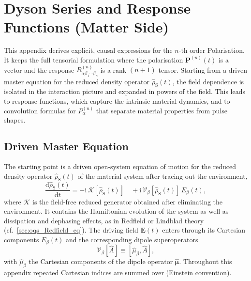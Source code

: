 \chapter{Dyson Series and Response Functions (Matter Side)}
\label{app:response_functions}

This appendix derives explicit, causal expressions for the $n$-th order Polarisation. It keeps the full tensorial formulation where the polarisation $\boldsymbol P^{(n)}(t)$ is a vector and the response $R^{(n)}_{\alpha\beta_1\cdots\beta_n}$ is a rank-$(n{+}1)$ tensor. Starting from a driven master equation for the reduced density operator $\hat{\rho}_{\mathrm{S}}(t)$, the field dependence is isolated in the interaction picture and expanded in powers of the field. This leads to response functions, which capture the intrinsic material dynamics, and to convolution formulas for $P^{(n)}_{\alpha}$ that separate material properties from pulse shapes.

\section{Driven Master Equation}
\label{app:sec:dyson_response}

The starting point is a driven open-system equation of motion for the reduced density operator $\hat{\rho}_{\mathrm{S}}(t)$ of the material system after tracing out the environment,
\begin{equation}
	\frac{\mathrm{d}\hat{\rho}_{\mathrm{S}}(t)}{\mathrm{d}t}
	= -\mathrm{i}\,\mathcal{K}[\hat{\rho}_{\mathrm{S}}(t)]
	\quad + \mathrm{i}\,\mathcal{V}_{\beta}[\hat{\rho}_{\mathrm{S}}(t)]\,E_{\beta}(t),
	\label{eq:app_master_equation_with_field}
\end{equation}
where $\mathcal{K}$ is the field-free reduced generator obtained after eliminating the environment. It contains the Hamiltonian evolution of the system as well as dissipation and dephasing effects, as in Redfield or Lindblad theory (cf.~\autoref{sec:oqs_Redfield_eq}). The driving field $\boldsymbol{E}(t)$ enters through its Cartesian components $E_{\beta}(t)$ and the corresponding dipole superoperators
\begin{equation}
	\mathcal{V}_{\beta}[\hat{A}] \equiv [\hat{\mu}_{\beta},\hat{A}],
	\label{eq:app_dipole_superoperator}
\end{equation}
with $\hat{\mu}_{\beta}$ the Cartesian components of the dipole operator $\hat{\boldsymbol{\mu}}$. Throughout this appendix repeated Cartesian indices are summed over (Einstein convention).

